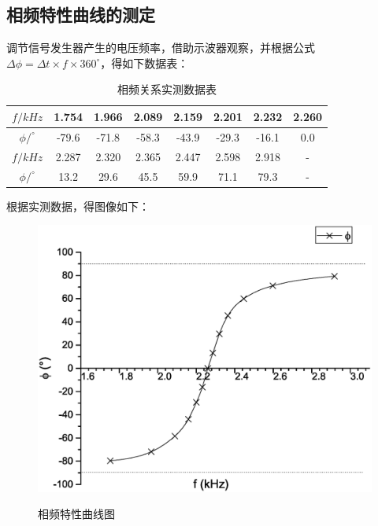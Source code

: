 \documentclass{ctexart}
\begin{document}
\subsection{相频特性曲线的测定}
调节信号发生器产生的电压频率，借助示波器观察，并根据公式$\Delta \phi = \Delta t \times f \times 360^\circ$，得如下数据表：
\begin{table}[H]
  \centering
  \caption{相频关系实测数据表}
    \begin{tabular}{|c|c|c|c|c|c|c|c|}\hline
    $f/kHz$ & 1.754 & 1.966 & 2.089 & 2.159 & 2.201 & 2.232 & 2.260 \\\hline
    $\phi/^\circ$ & -79.6 & -71.8 & -58.3 & -43.9 & -29.3 & -16.1 & 0.0 \\\hline
    $f/kHz$ & 2.287 & 2.320 & 2.365 & 2.447 & 2.598 & 2.918 & - \\\hline
    $\phi/^\circ$ & 13.2  & 29.6  & 45.5  & 59.9  & 71.1  & 79.3  &-  \\\hline
    \end{tabular}%
  \label{tab:addlabel}%
\end{table}%
根据实测数据，得图像如下：
\begin{figure}[H]
  \centering
  \caption{相频特性曲线图}
  \includegraphics[width=1.0\textwidth]{1}
  \label{fig:digit}
\end{figure}
\end{document}
